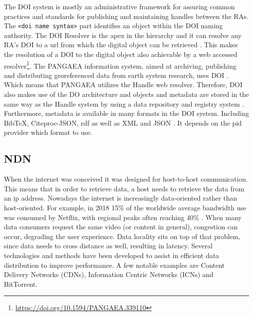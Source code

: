 The DOI system is mostly an administrative framework for assuring common practices and standards for publishing and maintaining handles between the RAs. 
The \texttt{<doi name syntax>} part identifies an object within the DOI naming authority. The DOI Resolver is the apex in the hierarchy and it can resolve any RA's DOI to a \gls{url} from which the digital object can be retrieved \cite{icn-bd}. This makes the resolution of a DOI to the digital object also achievable by a web accessed resolver\footnote{\url{https://doi.org/10.1594/PANGAEA.339110}}. The PANGAEA information system, aimed at archiving, publishing and distributing georeferenced data from earth system research, uses DOI \cite{pang}. Which means that PANGAEA utilizes the Handle web resolver. Therefore, DOI also makes use of the DO architecture and objects and metadata are stored in the same way as the Handle system by using a data repository and registry system \cite{dona-2}.
Furthermore, metadata is available in many formats in the DOI system. Including BibTeX, Citeproc-JSON, \gls{rdf} as well as XML and JSON \cite{doi-met}. It depends on the \gls{pid} provider which format to use.

\subsection{NDN}
\label{introduction-ndn}
When the internet was conceived it was designed for host-to-host communication. This means that in order to retrieve data, a host needs to retrieve the data from an \gls{ip} address. Nowadays the internet is increasingly data-oriented rather than host-oriented. For example, in 2018 15\% of the worldwide average bandwidth use was consumed by Netflix, with regional peaks often reaching 40\% \cite{introduction-netflix}. When many data consumers request the same video (or content in general), congestion can occur, degrading the user experience. Data locality sits on top of that problem, since data needs to cross distance as well, resulting in latency. Several technologies and methods have been developed to assist in efficient data distribution to improve performance. A few notable examples are Content Delivery Networks (CDNs), Information Centric Networks (ICNs) and BitTorrent.

